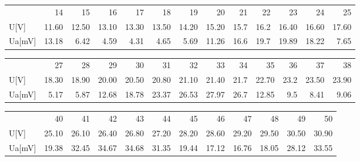 \documentclass[a4paper,10pt]{article}
\begin{document}
\begin{figure}[H]
\begin{tabular}{l rrrrrrrrrrrr}
{} &     14 &     15 &     16 &     17 &     18 &     19 &     20 &    21 &    22 &     23 &     24 &     25 \\
U[V]  &  11.60 &  12.50 &  13.10 &  13.30 &  13.50 &  14.20 &  15.20 &  15.7 &  16.2 &  16.40 &  16.60 &  17.60 \\
Ua[mV] &  13.18 &   6.42 &   4.59 &   4.31 &   4.65 &   5.69 &  11.26 &  16.6 &  19.7 &  19.89 &  18.22 &   7.65 \\
\end{tabular}
\end{figure}

\begin{figure}[H]
\begin{tabular}{l rrrrrrrrrrrr}
{} &     27 &     28 &     29 &     30 &     31 &     32 &     33 &    34 &     35 &    36 &     37 &     38 \\
U[V]  &  18.30 &  18.90 &  20.00 &  20.50 &  20.80 &  21.10 &  21.40 &  21.7 &  22.70 &  23.2 &  23.50 &  23.90 \\
Ua[mV] &   5.17 &   5.87 &  12.68 &  18.78 &  23.37 &  26.53 &  27.97 &  26.7 &  12.85 &   9.5 &   8.41 &   9.06 \\
\end{tabular}
\end{figure}

\begin{figure}[H]
\begin{tabular}{l rrrrrrrrrrr}
{} &     40 &     41 &     42 &     43 &     44 &     45 &     46 &     47 &     48 &     49 &     50 \\
U[V]  &  25.10 &  26.10 &  26.40 &  26.80 &  27.20 &  28.20 &  28.60 &  29.20 &  29.50 &  30.50 &  30.90 \\
Ua[mV] &  19.38 &  32.45 &  34.67 &  34.68 &  31.35 &  19.44 &  17.12 &  16.76 &  18.05 &  28.12 &  33.55 \\
\end{tabular}
\end{figure}
\end{document}
